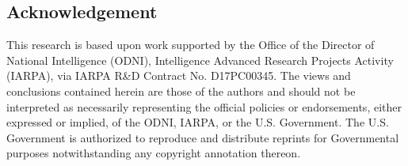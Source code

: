 \documentclass[10pt,twocolumn,letterpaper]{article}
\begin{document}
\subsection{Acknowledgement}
This research is based upon work supported by the Office of the Director of National Intelligence (ODNI), Intelligence Advanced Research Projects Activity (IARPA), via IARPA R&D Contract No. D17PC00345. The views and conclusions contained herein are those of the authors and should not be interpreted as necessarily representing the official policies or endorsements, either expressed or implied, of the ODNI, IARPA, or the U.S. Government. The U.S. Government is authorized to reproduce and distribute reprints for Governmental purposes notwithstanding any copyright annotation thereon.

{\small


}
\end{document}
